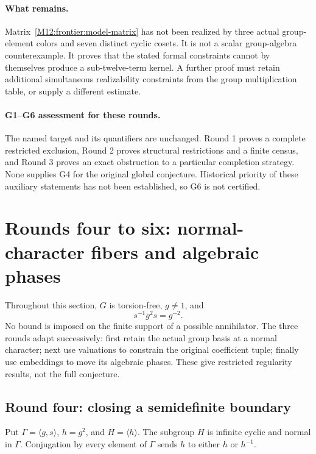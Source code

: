\documentclass[11pt,a4paper,oneside]{report}
\theoremstyle{definition}
\theoremstyle{remark}
\begin{document}
\paragraph{What remains.}
Matrix~\eqref{M12:frontier:model-matrix} has not been realized by three
actual group-element colors and seven distinct cyclic cosets. It is
not a scalar group-algebra counterexample. It proves that the stated
formal constraints cannot by themselves produce a sub-twelve-term
kernel. A further proof must retain additional simultaneous
realizability constraints from the group multiplication table, or
supply a different estimate.

\paragraph{G1--G6 assessment for these rounds.}
The named target and its quantifiers are unchanged. Round 1 proves a
complete restricted exclusion, Round 2 proves structural restrictions
and a finite census, and Round 3 proves an exact obstruction to a
particular completion strategy. None supplies G4 for the original
global conjecture. Historical priority of these auxiliary statements
has not been established, so G6 is not certified.

\section{Rounds four to six: normal-character fibers and algebraic phases}
\label{M12:ten:complex}

Throughout this section, $G$ is torsion-free, $g\ne1$, and
\begin{equation}\label{M12:ten:inversion}
s^{-1}g^2s=g^{-2}.
\end{equation}
No bound is imposed on the finite support of a possible annihilator.
The three rounds adapt successively: first retain the actual group basis
at a normal character; next use valuations to constrain the original
coefficient tuple; finally use embeddings to move its algebraic phases.
These give restricted regularity results, not the full conjecture.

\subsection{Round four: closing a semidefinite boundary}

Put $\Gamma=\langle g,s\rangle$, $h=g^2$, and $H=\langle h\rangle$.
The subgroup $H$ is infinite cyclic and normal in $\Gamma$.
Conjugation by every element of $\Gamma$ sends $h$ to either $h$ or
$h^{-1}$.
\end{document}
